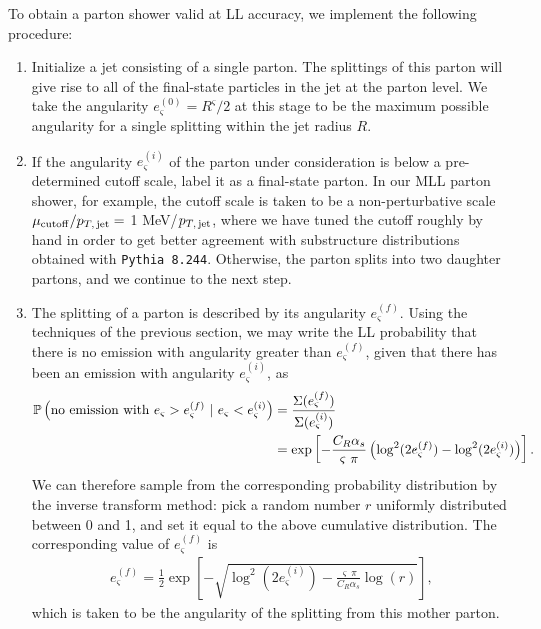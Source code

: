 To obtain a parton shower valid at LL accuracy, we implement the following procedure:
\begin{enumerate}
    \item
    \label{item:LL_ps_start}
    Initialize a jet consisting of a single parton.
    The splittings of this parton will give rise to all of the final-state particles in the jet at the parton level.
    We take the angularity \(e^{(0)}_\varsigma = R^\varsigma / 2\) at this stage to be the maximum possible angularity for a single splitting within the jet radius \(R\).

    \item
    \label{item:cutoff}
    If the angularity \(e^{(i)}_\varsigma\) of the parton under consideration is below a pre-determined cutoff scale, label it as a final-state parton.
    In our MLL parton shower, for example, the cutoff scale is taken to be a non-perturbative scale \(\mu_{\rm cutoff}/ p_{T,\,{\rm jet}} = \) 1 MeV/\(p_{T,\,{\rm jet}}\), where we have tuned the cutoff roughly by hand in order to get better agreement with substructure distributions obtained with \texttt{Pythia 8.244}.
    Otherwise, the parton splits into two daughter partons, and we continue to the next step.

    \item
    \label{item:LL_angularity_gen}
    The splitting of a parton is described by its angularity \(e^{(f)}_\varsigma\).
    Using the techniques of the previous section, we may write the LL probability that there is no emission with angularity greater than \(e^{(f)}_\varsigma\), given that there has been an emission with angularity \(e^{(i)}_\varsigma\), as
    \begin{align}
        \label{eqn:alg_LLang_ratio}
        \mathbb{P}
        \left(
            {\rm no~emission~with~}e_\varsigma>e^{(f)}_\varsigma
            ~|~
            e_\varsigma < e^{(i)}_\varsigma
        \right)
        &=
        \frac{\Sigma(e^{(f)}_\varsigma)}{\Sigma(e^{(i)}_\varsigma)}
        \\
        \notag
        &=
        \exp\left[
            -\frac{C_R \alpha_s}{\varsigma~\pi}
            \left(
                \log^2(2 e^{(f)}_\varsigma) - \log^2(2 e^{(i)}_\varsigma)
            \right)
        \right]
        .
    \end{align}
    We can therefore sample from the corresponding probability distribution by the inverse transform method:
    pick a random number \(r\) uniformly distributed between 0 and 1, and set it equal to the above cumulative distribution.
    The corresponding value of \(e^{(f)}_\varsigma\) is
    \begin{align}
        \label{eqn:alg_LLang}
        e^{(f)}_\varsigma
        =
        \frac{1}{2}
        \exp\left[
            -\sqrt{\log^2(2 e^{(i)}_\varsigma) - \frac{\varsigma~\pi}{C_R \alpha_s} \log(r)}
        \right]
        ,
    \end{align}
    which is taken to be the angularity of the splitting from this mother parton.


\end{enumerate}
